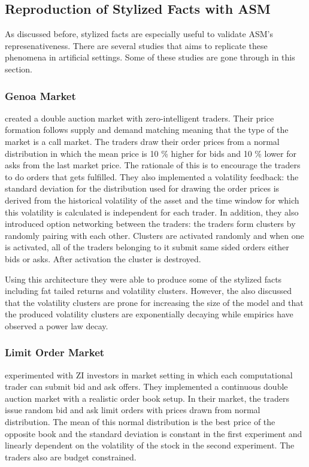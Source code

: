 
\subsection{Reproduction of Stylized Facts with ASM}
As discussed before, stylized facts are especially useful
to validate ASM's represenativeness. There are several 
studies that aims to replicate these phenomena in 
artificial settings. Some of these studies are
gone through in this section.
% 
\subsubsection{Genoa Market}

\citet{Genoa01} created a double auction market with zero-intelligent 
traders. Their price formation follows supply and demand matching meaning 
that the type of the market is a call market. The traders draw their 
order prices from a normal distribution in which the mean price is 10 \%
higher for bids and 10 \% lower for asks from the last market price. The
rationale of this is to encourage the traders to do orders that gets fulfilled.
They also implemented a volatility feedback: the standard deviation for 
the distribution used for drawing the order prices is derived from the 
historical volatility of the asset and the time window for which this
volatility is calculated is independent for each trader. In addition,
they also introduced option networking between the traders: the traders
form clusters by randomly pairing with each other. Clusters are activated
randomly and when one is activated, all of the traders belonging to it
submit same sided orders either bids or asks. After activation the cluster is destroyed.

Using this architecture they were able to produce some of the stylized facts
including fat tailed returns and volatility clusters. However, the also discussed
that the volatility clusters are prone for increasing the size of the model and
that the produced volatility clusters are exponentially decaying while empirics have
observed a power law decay.

\subsubsection{Limit Order Market}
\citet{Raberto05} experimented with ZI investors in market setting
in which each computational trader can submit bid and ask offers. They
implemented a continuous double auction market with a realistic order
book setup. In their market, the traders issue random bid and ask limit
orders with prices drawn from normal distribution. The mean of this 
normal distribution is the best price of the opposite book and the 
standard deviation is constant in the first experiment and linearly 
dependent on the volatility of the stock in the second experiment. The
traders also are budget constrained. 

